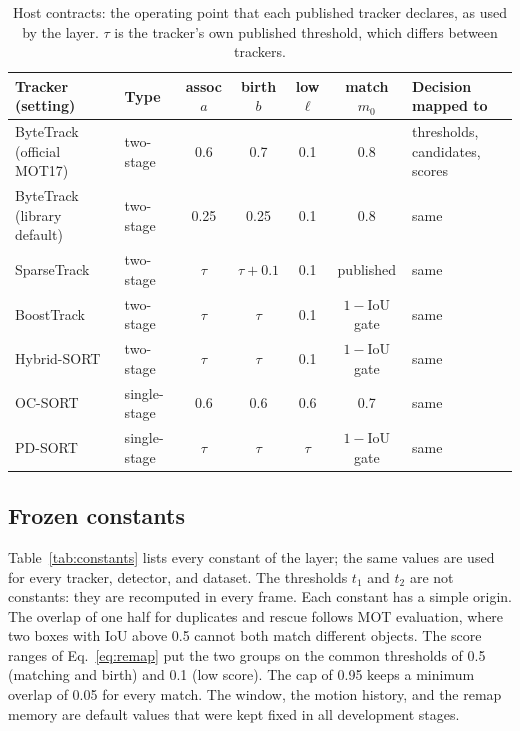 \documentclass[pdflatex,sn-mathphys-num,iicol]{sn-jnl}
\begin{document}
\begin{table}[t]
\caption{Host contracts: the operating point that each published tracker
declares, as used by the layer. $\tau$ is the tracker's own published
threshold, which differs between trackers.}
\label{tab:contracts}
\centering\footnotesize
\setlength{\tabcolsep}{4pt}
\begin{tabular}{@{}>{\raggedright\arraybackslash}p{30mm}lcccc>{\raggedright\arraybackslash}p{32mm}@{}}
\toprule
Tracker (setting) & Type & assoc $a$ & birth $b$ & low $\ell$ & match $m_0$ & Decision mapped to\\
\midrule
ByteTrack (official MOT17) & two-stage & 0.6 & 0.7 & 0.1 & 0.8 & thresholds, candidates, scores\\
ByteTrack (library default) & two-stage & 0.25 & 0.25 & 0.1 & 0.8 & same\\
SparseTrack & two-stage & $\tau$ & $\tau+0.1$ & 0.1 & published & same\\
BoostTrack & two-stage & $\tau$ & $\tau$ & 0.1 & $1-$IoU gate & same\\
Hybrid-SORT & two-stage & $\tau$ & $\tau$ & 0.1 & $1-$IoU gate & same\\
OC-SORT & single-stage & 0.6 & 0.6 & 0.6 & 0.7 & same\\
PD-SORT & single-stage & $\tau$ & $\tau$ & $\tau$ & $1-$IoU gate & same\\
\bottomrule
\end{tabular}
\end{table}

\subsection{Frozen constants}\label{sec:constants}
Table~\ref{tab:constants} lists every constant of the layer; the same
values are used for every tracker, detector, and dataset. The thresholds
$t_1$ and $t_2$ are not constants: they are recomputed in every frame. Each
constant has a simple origin. The overlap of one half for duplicates and
rescue follows MOT evaluation, where two boxes with IoU above 0.5 cannot both
match different objects. The score ranges of Eq.~\eqref{eq:remap} put the
two groups on the common thresholds of 0.5 (matching and birth) and 0.1 (low
score). The cap of 0.95 keeps a minimum overlap of 0.05 for every match. The
window, the motion history, and the remap memory are default values that
were kept fixed in all development stages.
\end{document}
